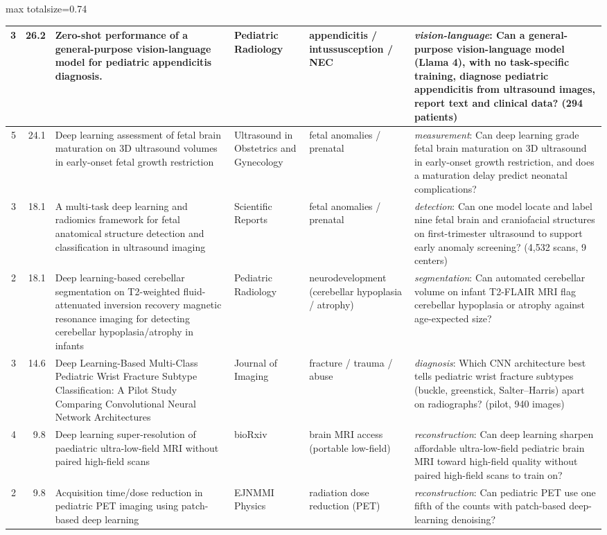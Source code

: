 \documentclass[aspectratio=169]{beamer}
\begin{document}
\begin{frame}
\begin{adjustbox}{max totalsize={\textwidth}{0.74\textheight}}
\begin{tabular}{|r|r|>{\raggedright\arraybackslash}p{}|>{\raggedright\arraybackslash}p{}|>{\raggedright\arraybackslash}p{}|>{\raggedright\arraybackslash}p{}|}
3 & 26.2 & Zero-shot performance of a general-purpose vision-language model for pediatric appendicitis diagnosis. & Pediatric Radiology & appendicitis / intussusception / NEC & \textit{vision-language}: Can a general-purpose vision-language model (Llama 4), with no task-specific training, diagnose pediatric appendicitis from ultrasound images, report text and clinical data? (294 patients) \\ \hline
5 & 24.1 & Deep learning assessment of fetal brain maturation on 3D ultrasound volumes in early-onset fetal growth restriction & Ultrasound in Obstetrics and Gynecology & fetal anomalies / prenatal & \textit{measurement}: Can deep learning grade fetal brain maturation on 3D ultrasound in early-onset growth restriction, and does a maturation delay predict neonatal complications? \\ \hline
3 & 18.1 & A multi-task deep learning and radiomics framework for fetal anatomical structure detection and classification in ultrasound imaging & Scientific Reports & fetal anomalies / prenatal & \textit{detection}: Can one model locate and label nine fetal brain and craniofacial structures on first-trimester ultrasound to support early anomaly screening? (4,532 scans, 9 centers) \\ \hline
2 & 18.1 & Deep learning-based cerebellar segmentation on T2-weighted fluid-attenuated inversion recovery magnetic resonance imaging for detecting cerebellar hypoplasia/atrophy in infants & Pediatric Radiology & neurodevelopment (cerebellar hypoplasia / atrophy) & \textit{segmentation}: Can automated cerebellar volume on infant T2-FLAIR MRI flag cerebellar hypoplasia or atrophy against age-expected size? \\ \hline
3 & 14.6 & Deep Learning-Based Multi-Class Pediatric Wrist Fracture Subtype Classification: A Pilot Study Comparing Convolutional Neural Network Architectures & Journal of Imaging & fracture / trauma / abuse & \textit{diagnosis}: Which CNN architecture best tells pediatric wrist fracture subtypes (buckle, greenstick, Salter--Harris) apart on radiographs? (pilot, 940 images) \\ \hline
4 & 9.8 & Deep learning super-resolution of paediatric ultra-low-field MRI without paired high-field scans & bioRxiv & brain MRI access (portable low-field) & \textit{reconstruction}: Can deep learning sharpen affordable ultra-low-field pediatric brain MRI toward high-field quality without paired high-field scans to train on? \\ \hline
2 & 9.8 & Acquisition time/dose reduction in pediatric PET imaging using patch-based deep learning & EJNMMI Physics & radiation dose reduction (PET) & \textit{reconstruction}: Can pediatric PET use one fifth of the counts with patch-based deep-learning denoising? \\ \hline

\end{tabular}
\end{adjustbox}
\end{frame}
\end{document}
